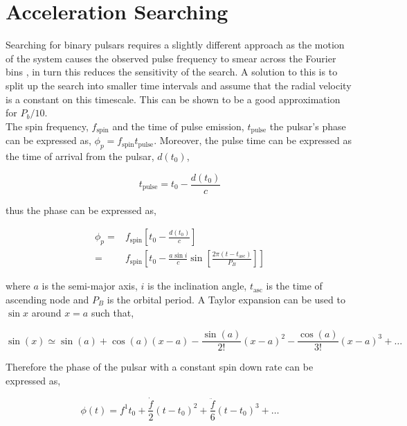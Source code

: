 \chapter{Acceleration Searching} \label{appen:zparams}

Searching for binary pulsars requires a slightly different approach as the motion of the system causes the observed pulse frequency to smear across the Fourier bins \citep{Ransom-z-2001}, in turn this reduces the sensitivity of the search. A solution to this is to split up the search into smaller time intervals and assume that the radial velocity is a constant on this timescale. This can be shown to be a good approximation for $P_b/10$. \\ 
The spin frequency, $f_{\text{spin}}$ and the time of pulse emission, $t_{\text{pulse}}$ the pulsar's phase can be expressed as, $\phi_p = f_{\text{spin}}t_{\text{pulse}}$. Moreover, the pulse time can be expressed as the time of arrival from the pulsar, $d(t_0)$, 

\begin{equation}
    t_{\text{pulse}} = t_0 - \frac{d(t_0)}{c}
\end{equation}

thus the phase can be expressed as,

\begin{align}
    \phi_p = & f_{\text{spin}}\left[ t_0 - \frac{d(t_0)}{c}\right] \\ 
    = & f_\text{spin} \left[ t_0 - \frac{a \sin i}{c} \sin \left[ \frac{2 \pi (t - t_{\text{asc}})}{P_B} \right] \right]
\end{align}

where $a$ is the semi-major axis, $i$ is the inclination angle, $t_{\text{asc}}$ is the time of ascending node and $P_B$ is the orbital period. A Taylor expansion can be used to $\sin x$ around $x = a$ such that, 

\begin{equation}
    \sin (x) \simeq   \sin (a) + \cos (a)(x - a) - \frac{\sin (a)}{2!}(x - a)^2 - \frac{\cos (a)}{3!}(x - a)^3 + \ldots
\end{equation}

Therefore the phase of the pulsar with a constant spin down rate can be expressed as, 

\begin{equation}
  \phi(t) = f^1 t_0 + \frac{\dot f}{2} (t - t_0)^2 + \frac{\ddot f}{6} (t - t_0)^3 + \ldots 
\end{equation}

